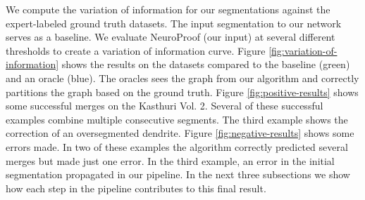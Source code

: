 We compute the variation of information for our segmentations against the expert-labeled ground truth datasets. 
The input segmentation to our network serves as a baseline. 
We evaluate NeuroProof (our input) at several different thresholds to create a variation of information curve. 
Figure \ref{fig:variation-of-information} shows the results on the datasets compared to the baseline (green) and an oracle (blue). 
The oracles sees the graph from our algorithm and correctly partitions the graph based on the ground truth. 
Figure \ref{fig:positive-results} shows some successful merges on the Kasthuri Vol. 2. 
Several of these successful examples combine multiple consecutive segments. 
The third example shows the correction of an oversegmented dendrite. 
Figure \ref{fig:negative-results} shows some errors made. 
In two of these examples the algorithm correctly predicted several merges but made just one error.
In the third example, an error in the initial segmentation propagated in our pipeline. 
In the next three subsections we show how each step in the pipeline contributes to this final result.

